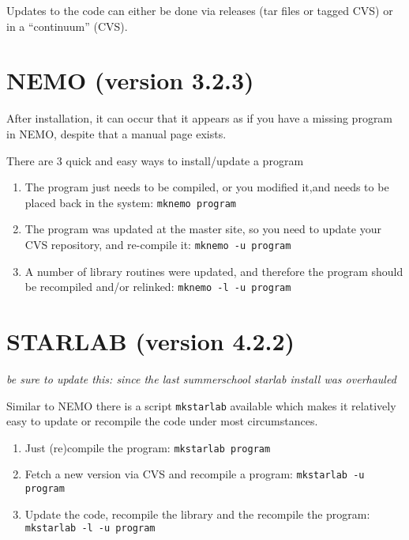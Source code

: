 Updates to the code can either be done via releases (tar files or
tagged CVS) or in a ``continuum'' (CVS).

\section{NEMO (version 3.2.3)}
After installation, it can occur that it appears 
as if you have a missing program in NEMO, despite that a 
manual page exists.

There are 3 quick and easy ways to install/update a program

\begin{enumerate}

\item
The program just needs to be compiled, or you modified it,and needs to be
placed back in the system:
{\tt mknemo program}

\item
The program was updated at the master site, so you need to update your CVS
repository, and re-compile it:
{\tt mknemo -u program}

\item
A number of library routines were updated, and therefore the program
should be recompiled and/or relinked:
{\tt mknemo -l -u program}

\end{enumerate}

\section{STARLAB (version 4.2.2)}

{\it be sure to update this: since the last summerschool starlab install
was overhauled}

Similar to NEMO there is a script {\tt mkstarlab} available which
makes it relatively easy to update or recompile the code under
most circumstances.

\begin{enumerate}

\item
Just (re)compile the program:
{\tt mkstarlab program}

\item
Fetch a new version via CVS and recompile a program:
{\tt mkstarlab -u program}

\item
Update the code, recompile the library and the recompile the program:
{\tt mkstarlab -l -u program}

\end{enumerate}

